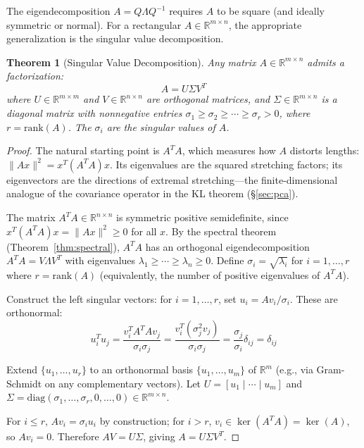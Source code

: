 \documentclass[12pt,a4paper]{report}
\theoremstyle{thms}
\newtheorem{theorem}{Theorem}[section]
\theoremstyle{defns}
\begin{document}
The eigendecomposition $A = Q\Lambda Q^{-1}$ requires $A$ to be square (and ideally symmetric or normal). For a rectangular $A \in \mathbb{R}^{m \times n}$, the appropriate generalization is the singular value decomposition.

\begin{theorem}[Singular Value Decomposition]
    Any matrix $A \in \mathbb{R}^{m \times n}$ admits a factorization:
    \begin{equation}
        A = U\Sigma V^T
        \label{eq:svd}
    \end{equation}
    where $U \in \mathbb{R}^{m \times m}$ and $V \in \mathbb{R}^{n \times n}$ are orthogonal matrices, and $\Sigma \in \mathbb{R}^{m \times n}$ is a diagonal matrix with nonnegative entries $\sigma_1 \geq \sigma_2 \geq \cdots \geq \sigma_r > 0$, where $r = \mathrm{rank}(A)$. The $\sigma_i$ are the singular values of $A$.
    \label{thm:svd}
\end{theorem}

\begin{proof}
    The natural starting point is $A^TA$, which measures how $A$ distorts lengths: $\|Ax\|^2 = x^T(A^TA)x$. Its eigenvalues are the squared stretching factors; its eigenvectors are the directions of extremal stretching—the finite-dimensional analogue of the covariance operator in the KL theorem (\S\ref{sec:pca}).

    The matrix $A^TA \in \mathbb{R}^{n \times n}$ is symmetric positive semidefinite, since $x^T(A^TA)x = \|Ax\|^2 \geq 0$ for all $x$. By the spectral theorem (Theorem~\ref{thm:spectral}), $A^TA$ has an orthogonal eigendecomposition $A^TA = V\Lambda V^T$ with eigenvalues $\lambda_1 \geq \cdots \geq \lambda_n \geq 0$. Define $\sigma_i = \sqrt{\lambda_i}$ for $i = 1, \ldots, r$ where $r = \mathrm{rank}(A)$ (equivalently, the number of positive eigenvalues of $A^TA$).

    Construct the left singular vectors: for $i = 1, \ldots, r$, set $u_i = Av_i / \sigma_i$. These are orthonormal:
    \begin{equation}
        u_i^T u_j = \dfrac{v_i^T A^T A v_j}{\sigma_i \sigma_j} = \dfrac{v_i^T (\sigma_j^2 v_j)}{\sigma_i \sigma_j} = \dfrac{\sigma_j}{\sigma_i}\delta_{ij} = \delta_{ij}
    \end{equation}

    Extend $\{u_1, \ldots, u_r\}$ to an orthonormal basis $\{u_1, \ldots, u_m\}$ of $\mathbb{R}^m$ (e.g., via Gram-Schmidt on any complementary vectors). Let $U = [u_1 \mid \cdots \mid u_m]$ and $\Sigma = \mathrm{diag}(\sigma_1, \ldots, \sigma_r, 0, \ldots, 0) \in \mathbb{R}^{m \times n}$.

    For $i \leq r$, $Av_i = \sigma_i u_i$ by construction; for $i > r$, $v_i \in \ker(A^TA) = \ker(A)$, so $Av_i = 0$. Therefore $AV = U\Sigma$, giving $A = U\Sigma V^T$.
\end{proof}
\end{document}
